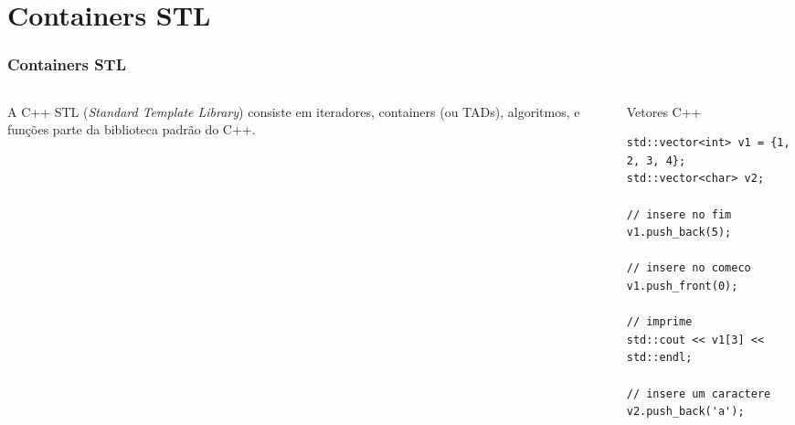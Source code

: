 \documentclass[xcolor={usenames,dvipsnames},10pt,presentation,aspectratio=169]{beamer}
\begin{document}
\section{Containers STL}
\begin{frame}[fragile]
  \frametitle{Containers STL}
  \vspace{-2mm}
    \begin{columns}
      \begin{column}{0.5\textwidth}
        A C++ STL (\emph{Standard Template Library}) consiste em iteradores,
        containers (ou TADs), algoritmos, e funções parte da biblioteca padrão
        do C++.
     \end{column}
      \begin{column}{0.5\textwidth}
  \begin{block}{Vetores C++}
\begin{lstlisting}
std::vector<int> v1 = {1, 2, 3, 4};
std::vector<char> v2;

// insere no fim
v1.push_back(5);

// insere no comeco
v1.push_front(0);

// imprime
std::cout << v1[3] << std::endl;

// insere um caractere
v2.push_back('a');
\end{lstlisting}
\end{block}
      \end{column}
    \end{columns}
\end{frame}
\end{document}
